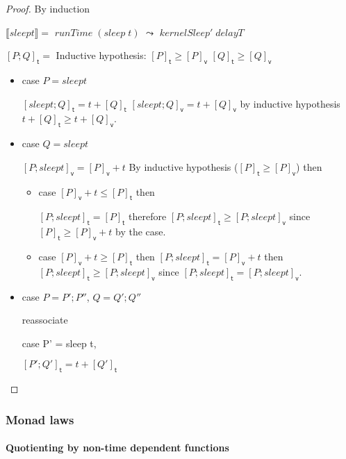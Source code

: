 \documentclass[preprint]{sigplanconf}
\newcommand{\Varid}[1]{\mathit{#1}}
\renewcommand{\leq}{\leqslant}
\renewcommand{\geq}{\geqslant}
\theoremstyle{definition}
\newcommand{\vtime}[1]{[#1]_{\mathsf{v}}}
\newcommand{\etime}[1]{[#1]_{\mathsf{t}}}
\newcommand{\interp}[1]{\llbracket{#1}\rrbracket}
\begin{document}
\begin{proof}
By induction %

$\interp{sleep t} = $
\ensuremath{\Varid{runTime}\;(\Varid{sleep}\;\Varid{t})} $\leadsto$ \ensuremath{\Varid{kernelSleep'}\;\Varid{delayT}}

$\etime{P;Q} = $
Inductive hypothesis: $\etime{P} \geq \vtime{P}$
              $\etime{Q} \geq \vtime{Q}$


\begin{itemize}
\item case $P = sleep t$ 

$\etime{sleep t; Q} = t + \etime{Q}$ 
$\vtime{sleep t; Q} = t + \vtime{Q}$
by inductive hypothesis $t + \etime{Q} \geq t + \vtime{Q}$.

\item case $Q = sleep t$

$\vtime{P; sleep t} = \vtime{P} + t$
By inductive hypothesis ($\etime{P} \geq \vtime{P}$) then


\begin{itemize}
\item case $\vtime{P} + t \leq \etime{P}$ then

$\etime{P; sleep t} = \etime{P}$ 
therefore $\etime{P; sleep t} \geq \vtime{P; sleep t}$
since $\etime{P} \geq \vtime{P} + t$ by the case.

\item case $\vtime{P} + t \geq \etime{P}$ then
 $\etime{P; sleep t} = \vtime{P} + t$
then $\etime{P; sleep t} \geq \vtime{P; sleep t}$
since $\etime{P; sleep t} = \vtime{P; sleep t}$. 
\end{itemize}

\item case $P = P';P''$, $Q = Q';Q''$

reassociate 

case P' = sleep t, 

$\etime{P';Q'} = t + \etime{Q'}$
\end{itemize}

\end{proof}

\subsubsection{Monad laws}

\paragraph{Quotienting by non-time dependent functions}
\end{document}
